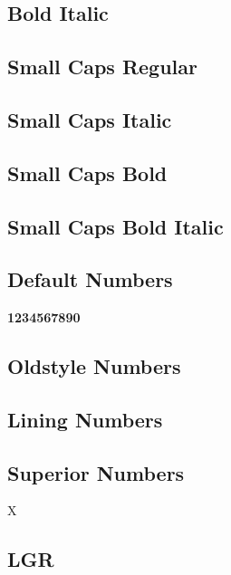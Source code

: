 \documentclass{article}
\begin{document}
\subsection*{Bold Italic}

\textbf{\textit{\lipsum[4]}}

\subsection*{Small Caps Regular}
\textsc{\lipsum[5]}

\subsection*{Small Caps Italic}
\textsc{\textit{\lipsum[6]}}

\subsection*{Small Caps Bold}
\textsc{\textbf{\lipsum[7]}}

\subsection*{Small Caps Bold Italic}

\textsc{\textbf{\textit{\lipsum[8]}}}

\subsection*{Default Numbers}

\textbf{1234567890}

\subsection*{Oldstyle Numbers}

{}

\subsection*{Lining Numbers}

{}

\subsection*{Superior Numbers}

X

\subsection*{LGR}
\end{document}
